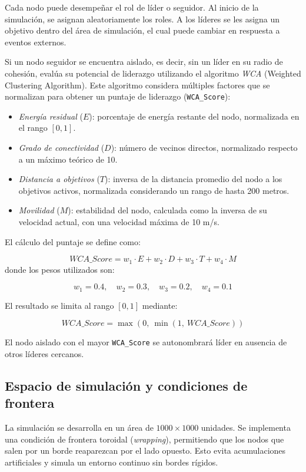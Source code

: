 \documentclass{article}
\begin{document}
Cada nodo puede desempeñar el rol de líder o seguidor. Al inicio de la simulación, se asignan aleatoriamente los roles. A los líderes se les asigna un objetivo dentro del área de simulación, el cual puede cambiar en respuesta a eventos externos.

Si un nodo seguidor se encuentra aislado, es decir, sin un líder en su radio de cohesión, evalúa su potencial de liderazgo utilizando el algoritmo \textit{WCA} (Weighted Clustering Algorithm). Este algoritmo considera múltiples factores que se normalizan para obtener un puntaje de liderazgo (\texttt{WCA\_Score}):

\begin{itemize}
    \item \textit{Energía residual} (\(E\)): porcentaje de energía restante del nodo, normalizada en el rango \([0,1]\).
    \item \textit{Grado de conectividad} (\(D\)): número de vecinos directos, normalizado respecto a un máximo teórico de 10.
    \item \textit{Distancia a objetivos} (\(T\)): inversa de la distancia promedio del nodo a los objetivos activos, normalizada considerando un rango de hasta 200 metros.
    \item \textit{Movilidad} (\(M\)): estabilidad del nodo, calculada como la inversa de su velocidad actual, con una velocidad máxima de 10 m/s.
\end{itemize}

El cálculo del puntaje se define como:

\[
{WCA\_Score} = w_1 \cdot E + w_2 \cdot D + w_3 \cdot T + w_4 \cdot M
\]
donde los pesos utilizados son:

\[
w_1 = 0.4, \quad w_2 = 0.3, \quad w_3 = 0.2, \quad w_4 = 0.1
\]

El resultado se limita al rango \([0, 1]\) mediante:

\[
{WCA\_Score} = \max\left(0,\ \min\left(1,\ {WCA\_Score}\right)\right)
\]

El nodo aislado con el mayor \texttt{WCA\_Score} se autonombrará líder en ausencia de otros líderes cercanos.

\subsection{Espacio de simulación y condiciones de frontera}

La simulación se desarrolla en un área de $1000 \times 1000$ unidades. Se implementa una condición de frontera toroidal (\textit{wrapping}), permitiendo que los nodos que salen por un borde reaparezcan por el lado opuesto. Esto evita acumulaciones artificiales y simula un entorno continuo sin bordes rígidos.
\end{document}
